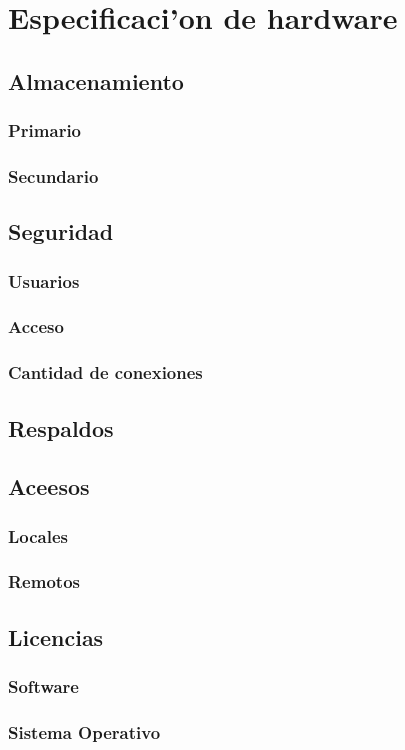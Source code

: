 \documentclass[letterpaper,openright,10pt,oneside]{report}
\begin{document}
\part{Especificaci'on de hardware}
	\chapter{Almacenamiento}
		\section{Primario}
		\section{Secundario}
	\chapter{Seguridad}
		\section{Usuarios}
		\section{Acceso}
		\section{Cantidad de conexiones}
	\chapter{Respaldos}
	\chapter{Aceesos}
		\section{Locales}
		\section{Remotos}
	\chapter{Licencias}
		\section{Software}
		\section{Sistema Operativo}
\end{document}
